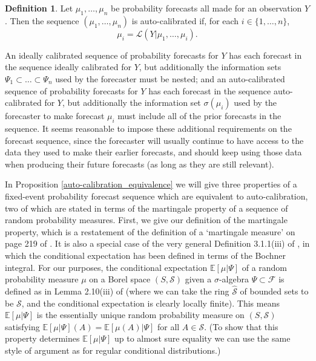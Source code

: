 \documentclass[aap]{imsart}
\theoremstyle{plain}
\theoremstyle{definition}
\newtheorem{definition}[theorem]{Definition}
\begin{document}
\begin{definition}\label{fixed_auto-calibration}
  Let $\mu_1, \ldots, \mu_n$ be probability forecasts all made for an observation $Y$. Then the sequence $(\mu_1, \ldots, \mu_n)$ is auto-calibrated if, for each $i \in \{1, \ldots, n\}$,
\begin{equation*}
\mu_i = \mathcal{L}(Y|\mu_1, \ldots, \mu_i).
\end{equation*}
\end{definition}

An ideally calibrated sequence of probability forecasts for $Y$ has each forecast in the sequence ideally calibrated for $Y$, but additionally the information sets $\Psi_1 \subset \ldots \subset \Psi_n$ used by the forecaster must be nested; and an auto-calibrated sequence of probability forecasts for $Y$ has each forecast in the sequence auto-calibrated for $Y$, but additionally the information set $\sigma(\mu_i)$ used by the forecaster to make forecast $\mu_i$ must include all of the prior forecasts in the sequence. It seems reasonable to impose these additional requirements on the forecast sequence, since the forecaster will usually continue to have access to the data they used to make their earlier forecasts, and should keep using those data when producing their future forecasts (as long as they are still relevant).

In Proposition \ref{auto-calibration_equivalence} we will give three properties of a fixed-event probability forecast sequence which are equivalent to auto-calibration, two of which are stated in terms of the martingale property of a sequence of random probability measures. First, we give our definition of the martingale property, which is a restatement of the definition of a `martingale measure' on page 219 of \cite{Hrw85}. It is also a special case of the very general Definition 3.1.1(iii) of \cite{Htn16}, in which the conditional expectation has been defined in terms of the Bochner integral. For our purposes, the conditional expectation $\mathbb{E}[\mu|\Psi]$ of a random probability measure $\mu$ on a Borel space $(S,\mathcal{S})$ given a $\sigma$-algebra $\Psi \subset \mathcal{F}$ is defined as in Lemma 2.10(iii) of \cite{Kll17} (where we can take the ring $\hat{\mathcal{S}}$ of bounded sets to be $\mathcal{S}$, and the conditional expectation is clearly locally finite). This means $\mathbb{E}[\mu|\Psi]$ is the essentially unique random probability measure on $(S,\mathcal{S})$ satisfying $\mathbb{E}[\mu|\Psi](A) = \mathbb{E}[\mu(A)|\Psi]$ for all $A \in \mathcal{S}$. (To show that this property determines $\mathbb{E}[\mu|\Psi]$ up to almost sure equality we can use the same style of argument as for regular conditional distributions.)
\end{document}
